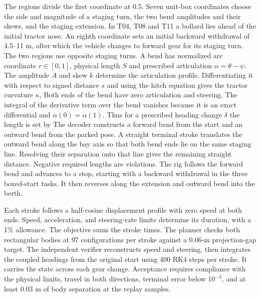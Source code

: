 The regions divide the first coordinate at 0.5. Seven unit-box coordinates choose the side and magnitude of a staging turn, the two bend amplitudes and their skews, and the staging extension. In T04, T08 and T11 a bollard lies ahead of the initial tractor nose. An eighth coordinate sets an initial backward withdrawal of 4.5--11 m, after which the vehicle changes to forward gear for its staging turn. The two regions use opposite staging turns. A bend has normalized arc coordinate $r\in[0,1]$, physical length $S$ and prescribed articulation $\alpha=\theta-\psi$. The amplitude $A$ and skew $k$ determine the articulation profile. Differentiating it with respect to signed distance $s$ and using the hitch equation gives the tractor curvature $\kappa$,
Both ends of the bend have zero articulation and steering. The integral of the derivative term over the bend vanishes because it is an exact differential and $\alpha(0)=\alpha(1)$. Thus for a prescribed heading change $\delta$ the length is set by
The decoder constructs a forward bend from the start and an outward bend from the parked pose. A straight terminal stroke translates the outward bend along the bay axis so that both bend ends lie on the same staging line. Resolving their separation onto that line gives the remaining straight distance. Negative required lengths are violations. The rig follows the forward bend and advances to a stop, starting with a backward withdrawal in the three boxed-start tasks. It then reverses along the extension and outward bend into the berth.

Each stroke follows a half-cosine displacement profile with zero speed at both ends. Speed, acceleration, and steering-rate limits determine its duration, with a 1\% allowance. The objective sums the stroke times. The planner checks both rectangular bodies at 97 configurations per stroke against a 0.06-m projection-gap target. The independent verifier reconstructs speed and steering, then integrates the coupled headings from the original start using 400 RK4 steps per stroke. It carries the state across each gear change. Acceptance requires compliance with the physical limits, travel in both directions, terminal error below $10^{-3}$, and at least 0.03 m of body separation at the replay samples.

